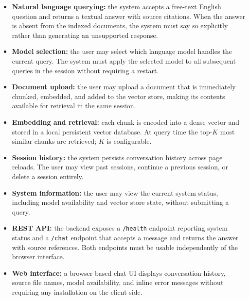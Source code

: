 \begin{itemize}
    \item[\textbf{R-F-1}] \textbf{Natural language querying:} the system accepts a
        free-text English question and returns a textual answer with source citations.
        When the answer is absent from the indexed documents, the system must say so
        explicitly rather than generating an unsupported response.

    \item[\textbf{R-F-2}] \textbf{Model selection:} the user may select which language
        model handles the current query. The system must apply the selected model to all
        subsequent queries in the session without requiring a restart.

    \item[\textbf{R-F-3}] \textbf{Document upload:} the user may upload a document
        that is immediately chunked, embedded, and added to the vector store, making
        its contents available for retrieval in the same session.

    \item[\textbf{R-F-4}] \textbf{Embedding and retrieval:} each chunk is encoded into
        a dense vector and stored in a local persistent vector database. At query time
        the top-$K$ most similar chunks are retrieved; $K$ is configurable.

    \item[\textbf{R-F-5}] \textbf{Session history:} the system persists conversation
        history across page reloads. The user may view past sessions, continue a
        previous session, or delete a session entirely.

    \item[\textbf{R-F-6}] \textbf{System information:} the user may view the current
        system status, including model availability and vector store state, without
        submitting a query.

    \item[\textbf{R-F-7}] \textbf{REST API:} the backend exposes a \texttt{/health}
        endpoint reporting system status and a \texttt{/chat} endpoint that accepts a
        message and returns the answer with source references. Both endpoints must be
        usable independently of the browser interface.

    \item[\textbf{R-F-8}] \textbf{Web interface:} a browser-based chat UI displays
        conversation history, source file names, model availability, and inline error
        messages without requiring any installation on the client side.
\end{itemize}


